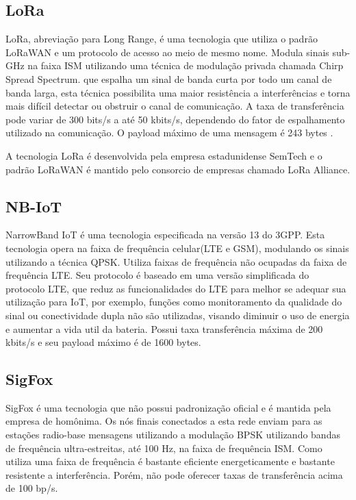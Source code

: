 \subsection{LoRa}
LoRa, abreviação para Long Range, é uma tecnologia que utiliza o padrão LoRaWAN e um protocolo de acesso ao meio de mesmo nome. Modula sinais sub-GHz na faixa ISM utilizando uma técnica de modulação  privada chamada Chirp Spread Spectrum. que espalha um sinal de banda curta por todo um canal de banda larga, esta técnica possibilita uma maior resistência a interferências e torna mais difícil detectar ou obstruir o canal de comunicação. A taxa de transferência pode variar de 300 bits/s a até 50 kbits/s, dependendo do fator de espalhamento utilizado na comunicação. O payload máximo de uma mensagem é 243 bytes \cite{mekki2019comparative}.

A tecnologia LoRa é desenvolvida pela empresa estadunidense SemTech e o padrão LoRaWAN é mantido pelo consorcio de empresas chamado LoRa Alliance.

\subsection{NB-IoT}
NarrowBand IoT é uma tecnologia especificada na versão 13 do 3GPP. Esta tecnologia opera na faixa de frequência celular(LTE e GSM), modulando os sinais utilizando a técnica QPSK. Utiliza faixas de frequência não ocupadas da faixa de frequência LTE. Seu protocolo é baseado em uma versão simplificada do protocolo LTE, que reduz as funcionalidades do LTE para melhor se adequar sua utilização para IoT, por exemplo, funções como monitoramento da qualidade do sinal ou conectividade dupla não são utilizadas, visando diminuir o uso de energia e aumentar a vida util da bateria. Possui taxa transferência máxima de 200 kbits/s e seu payload máximo é de 1600 bytes.

\subsection{SigFox}
SigFox é uma tecnologia que não possui padronização oficial e é mantida pela empresa de homônima. Os nós finais conectados a esta rede enviam para as estações radio-base mensagens utilizando a modulação BPSK utilizando bandas de frequência ultra-estreitas, até 100 Hz, na faixa de frequência ISM. Como utiliza uma faixa de frequência é bastante eficiente energeticamente e bastante resistente a interferência. Porém, não pode oferecer taxas de transferência acima de 100 bp/s.

